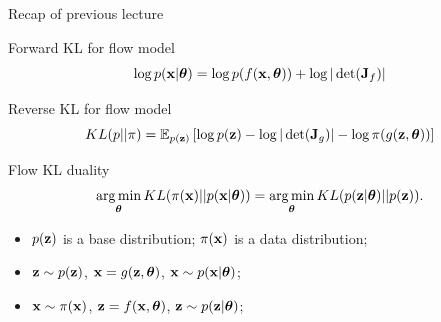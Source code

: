 \begin{frame}{Recap of previous lecture}
	\begin{block}{Forward KL for flow model}
	  	\vspace{-0.1cm}
		\[
			\log p(\mathbf{x}|\boldsymbol{\theta}) = \log p(f(\mathbf{x}, \boldsymbol{\theta})) + \log  |\det (\mathbf{J}_f)|
		\]
		\vspace{-0.3cm}
	\end{block}
	\begin{block}{Reverse KL for flow model}
  		\vspace{-0.5cm}
		\[
			KL(p || \pi)  = \mathbb{E}_{p(\mathbf{z})} \left[  \log p(\mathbf{z}) -  \log |\det (\mathbf{J}_g)| - \log \pi(g(\mathbf{z}, \boldsymbol{\theta})) \right]
		\]
		\vspace{-0.5cm}
	\end{block}
	\begin{block}{Flow KL duality}
	  	\vspace{-0.3cm}
		\[
			\operatorname*{arg\,min}_{\boldsymbol{\theta}} KL(\pi(\mathbf{x}) || p(\mathbf{x} | \boldsymbol{\theta})) = \operatorname*{arg\,min}_{\boldsymbol{\theta}} KL(p(\mathbf{z} | \boldsymbol{\theta}) || p(\mathbf{z})).
		\]
		\vspace{-0.3cm}
		\begin{itemize}
			\item $p(\mathbf{z})$ is a base distribution; $\pi(\mathbf{x})$ is a data distribution;
			\item $\mathbf{z} \sim p(\mathbf{z})$, $\mathbf{x} = g(\mathbf{z}, \boldsymbol{\theta})$, $\mathbf{x} \sim p(\mathbf{x}| \boldsymbol{\theta})$;
			\item $\mathbf{x} \sim \pi(\mathbf{x})$, $\mathbf{z} = f(\mathbf{x}, \boldsymbol{\theta})$, $\mathbf{z} \sim p(\mathbf{z} | \boldsymbol{\theta})$;
		\end{itemize}
	\end{block}
\end{frame}
